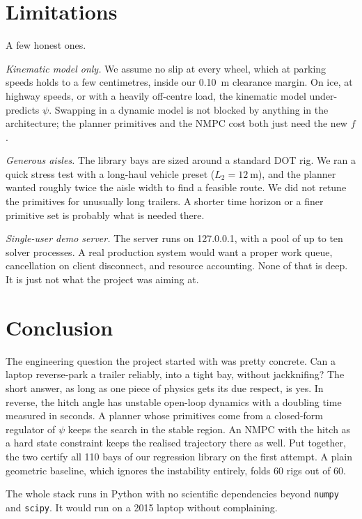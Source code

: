 \documentclass[conference]{IEEEtran}
\begin{document}
\section{Limitations}

A few honest ones.

\textit{Kinematic model only.} We assume no slip at every wheel, which at
parking speeds holds to a few centimetres, inside our \SI{0.10}{\meter}
clearance margin. On ice, at highway speeds, or with a heavily
off-centre load, the kinematic model under-predicts $\psi$. Swapping in
a dynamic model is not blocked by anything in the architecture; the
planner primitives and the NMPC cost both just need the new $f$.

\textit{Generous aisles.} The library bays are sized around a standard
DOT rig. We ran a quick stress test with a long-haul vehicle preset
($L_2 = \SI{12}{\meter}$), and the planner wanted roughly twice the
aisle width to find a feasible route. We did not retune the primitives
for unusually long trailers. A shorter time horizon or a finer primitive
set is probably what is needed there.

\textit{Single-user demo server.} The server runs on 127.0.0.1, with a
pool of up to ten solver processes. A real production system would want
a proper work queue, cancellation on client disconnect, and resource
accounting. None of that is deep. It is just not what the project was
aiming at.

\section{Conclusion}

The engineering question the project started with was pretty concrete.
Can a laptop reverse-park a trailer reliably, into a tight bay, without
jackknifing? The short answer, as long as one piece of physics gets its
due respect, is yes. In reverse, the hitch angle has unstable open-loop
dynamics with a doubling time measured in seconds. A planner whose
primitives come from a closed-form regulator of $\psi$ keeps the search
in the stable region. An NMPC with the hitch as a hard state constraint
keeps the realised trajectory there as well. Put together, the two
certify all 110 bays of our regression library on the first attempt. A
plain geometric baseline, which ignores the instability entirely, folds
60 rigs out of 60.

The whole stack runs in Python with no scientific dependencies beyond
\texttt{numpy} and \texttt{scipy}. It would run on a 2015 laptop without
complaining.
\end{document}

